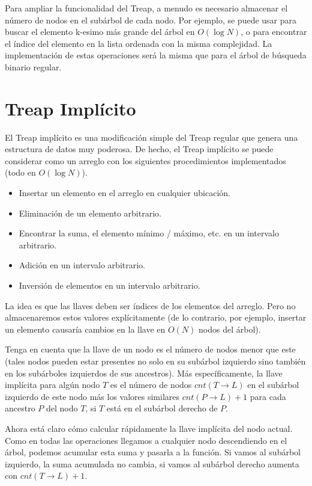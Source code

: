 \documentclass[12pt]{article}
\newcommand{\nl}{\vspace{0.3cm}}
\begin{document}
\nl

Para ampliar la funcionalidad del Treap, a menudo es necesario almacenar el número de nodos en el subárbol de cada nodo. Por ejemplo, se puede usar para buscar el elemento k-esimo más grande del árbol en $O(\log N)$, o para encontrar el índice del elemento en la lista ordenada con la misma complejidad. La implementación de estas operaciones será la misma que para el árbol de búsqueda binario regular.

\section{Treap Implícito}

El Treap implícito es una modificación simple del Treap regular que genera una estructura de datos muy poderosa. De hecho, el Treap implícito se puede considerar como un arreglo con los siguientes procedimientos implementados (todo en $O(\log N)$).

\begin{itemize}
	\item Insertar un elemento en el arreglo en cualquier ubicación.
	\item Eliminación de un elemento arbitrario.
	\item Encontrar la suma, el elemento mínimo / máximo, etc. en un intervalo arbitrario.
	\item Adición en un intervalo arbitrario.
	\item Inversión de elementos en un intervalo arbitrario.
\end{itemize}

La idea es que las llaves deben ser índices de los elementos del arreglo. Pero no almacenaremos estos valores explícitamente (de lo contrario, por ejemplo, insertar un elemento causaría cambios en la llave en $O(N)$ nodos del árbol).

\nl

Tenga en cuenta que la llave de un nodo es el número de nodos menor que este (tales nodos pueden estar presentes no solo en su subárbol izquierdo sino también en los subárboles izquierdos de sus ancestros). Más específicamente, la llave implícita para algún nodo $T$ es el número de nodos $cnt(T \rightarrow L)$ en el subárbol izquierdo de este nodo más los valores similares $cnt(P \rightarrow L) + 1$ para cada ancestro $P$ del nodo $T$, si $T$ está en el subárbol derecho de $P$.

\nl

Ahora está claro cómo calcular rápidamente la llave implícita del nodo actual. Como en todas las operaciones llegamos a cualquier nodo descendiendo en el árbol, podemos acumular esta suma y pasarla a la función. Si vamos al subárbol izquierdo, la suma acumulada no cambia, si vamos al subárbol derecho aumenta con $cnt(T \rightarrow L) + 1$.
\end{document}
